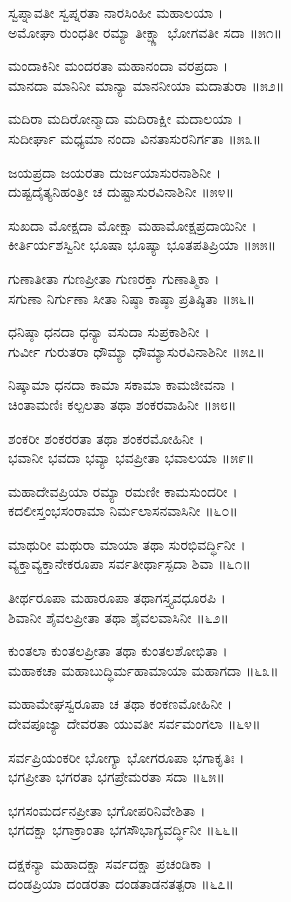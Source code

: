 ಸ್ವಪ್ನಾವತೀ ಸ್ವಪ್ನರತಾ ನಾರಸಿಂಹೀ ಮಹಾಲಯಾ ।\\
ಅಮೋಘಾ ರುಂಧತೀ ರಮ್ಯಾ ತೀಕ್ಷ್ಣಾ ಭೋಗವತೀ ಸದಾ ॥೫೧॥

ಮಂದಾಕಿನೀ ಮಂದರತಾ ಮಹಾನಂದಾ ವರಪ್ರದಾ ।\\
ಮಾನದಾ ಮಾನಿನೀ ಮಾನ್ಯಾ ಮಾನನೀಯಾ ಮದಾತುರಾ ॥೫೨॥

ಮದಿರಾ ಮದಿರೋನ್ಮಾದಾ ಮದಿರಾಕ್ಷೀ ಮದಾಲಯಾ ।\\
ಸುದೀರ್ಘಾ ಮಧ್ಯಮಾ ನಂದಾ ವಿನತಾಸುರನಿರ್ಗತಾ ॥೫೩॥

ಜಯಪ್ರದಾ ಜಯರತಾ ದುರ್ಜಯಾಸುರನಾಶಿನೀ ।\\
ದುಷ್ಟದೈತ್ಯನಿಹಂತ್ರೀ ಚ ದುಷ್ಟಾಸುರವಿನಾಶಿನೀ ॥೫೪॥

ಸುಖದಾ ಮೋಕ್ಷದಾ ಮೋಕ್ಷಾ ಮಹಾಮೋಕ್ಷಪ್ರದಾಯಿನೀ ।\\
ಕೀರ್ತಿರ್ಯಶಸ್ವಿನೀ ಭೂಷಾ ಭೂಷ್ಯಾ ಭೂತಪತಿಪ್ರಿಯಾ ॥೫೫॥

ಗುಣಾತೀತಾ ಗುಣಪ್ರೀತಾ ಗುಣರಕ್ತಾ ಗುಣಾತ್ಮಿಕಾ ।\\
ಸಗುಣಾ ನಿರ್ಗುಣಾ ಸೀತಾ ನಿಷ್ಠಾ ಕಾಷ್ಠಾ ಪ್ರತಿಷ್ಠಿತಾ ॥೫೬॥

ಧನಿಷ್ಠಾ ಧನದಾ ಧನ್ಯಾ ವಸುದಾ ಸುಪ್ರಕಾಶಿನೀ ।\\
ಗುರ್ವೀ ಗುರುತರಾ ಧೌಮ್ಯಾ ಧೌಮ್ಯಾಸುರವಿನಾಶಿನೀ ॥೫೭॥

ನಿಷ್ಕಾಮಾ ಧನದಾ ಕಾಮಾ ಸಕಾಮಾ ಕಾಮಜೀವನಾ ।\\
ಚಿಂತಾಮಣಿಃ ಕಲ್ಪಲತಾ ತಥಾ ಶಂಕರವಾಹಿನೀ ॥೫೮॥

ಶಂಕರೀ ಶಂಕರರತಾ ತಥಾ ಶಂಕರಮೋಹಿನೀ ।\\
ಭವಾನೀ ಭವದಾ ಭವ್ಯಾ ಭವಪ್ರೀತಾ ಭವಾಲಯಾ ॥೫೯॥

ಮಹಾದೇವಪ್ರಿಯಾ ರಮ್ಯಾ ರಮಣೀ ಕಾಮಸುಂದರೀ ।\\
ಕದಲೀಸ್ತಂಭಸಂರಾಮಾ ನಿರ್ಮಲಾಸನವಾಸಿನೀ ॥೬೦॥

ಮಾಥುರೀ ಮಥುರಾ ಮಾಯಾ ತಥಾ ಸುರಭಿವರ್ದ್ಧಿನೀ ।\\
ವ್ಯಕ್ತಾವ್ಯಕ್ತಾನೇಕರೂಪಾ ಸರ್ವತೀರ್ಥಾಸ್ಪದಾ ಶಿವಾ ॥೬೧॥

ತೀರ್ಥರೂಪಾ ಮಹಾರೂಪಾ ತಥಾಗಸ್ತ್ಯವಧೂರಪಿ ।\\
ಶಿವಾನೀ ಶೈವಲಪ್ರೀತಾ ತಥಾ ಶೈವಲವಾಸಿನೀ ॥೬೨॥

ಕುಂತಲಾ ಕುಂತಲಪ್ರೀತಾ ತಥಾ ಕುಂತಲಶೋಭಿತಾ ।\\
ಮಹಾಕಚಾ ಮಹಾಬುದ್ಧಿರ್ಮಹಾಮಾಯಾ ಮಹಾಗದಾ ॥೬೩॥

ಮಹಾಮೇಘಸ್ವರೂಪಾ ಚ ತಥಾ ಕಂಕಣಮೋಹಿನೀ ।\\
ದೇವಪೂಜ್ಯಾ ದೇವರತಾ ಯುವತೀ ಸರ್ವಮಂಗಲಾ ॥೬೪॥

ಸರ್ವಪ್ರಿಯಂಕರೀ ಭೋಗ್ಯಾ ಭೋಗರೂಪಾ ಭಗಾಕೃತಿಃ ।\\
ಭಗಪ್ರೀತಾ ಭಗರತಾ ಭಗಪ್ರೇಮರತಾ ಸದಾ ॥೬೫॥

ಭಗಸಂಮರ್ದನಪ್ರೀತಾ ಭಗೋಪರಿನಿವೇಶಿತಾ ।\\
ಭಗದಕ್ಷಾ ಭಗಾಕ್ರಾಂತಾ ಭಗಸೌಭಾಗ್ಯವರ್ದ್ಧಿನೀ ॥೬೬॥

ದಕ್ಷಕನ್ಯಾ ಮಹಾದಕ್ಷಾ ಸರ್ವದಕ್ಷಾ ಪ್ರಚಂಡಿಕಾ ।\\
ದಂಡಪ್ರಿಯಾ ದಂಡರತಾ ದಂಡತಾಡನತತ್ಪರಾ ॥೬೭॥

